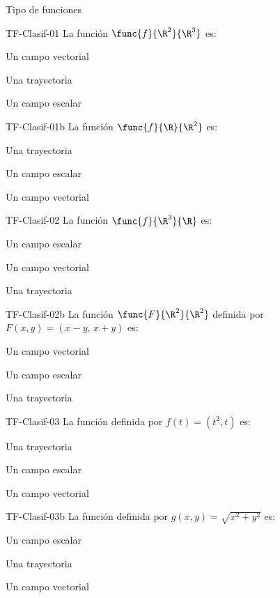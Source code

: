 \documentclass[a4,11pt]{aleph-notas}
\begin{document}
\begin{quiz}{Tipo de funciones}

\begin{multi}[]%
    {TF-Clasif-01}
    La función $\func{f}{\R^2}{\R^3}$ es:
    \item* Un campo vectorial
    \item Una trayectoria
    \item Un campo escalar
\end{multi}

\begin{multi}[]%
    {TF-Clasif-01b}
    La función $\func{f}{\R}{\R^2}$ es:
    \item* Una trayectoria
    \item Un campo escalar
    \item Un campo vectorial
\end{multi}

\begin{multi}[]%
    {TF-Clasif-02}
    La función $\func{f}{\R^3}{\R}$ es:
    \item* Un campo escalar
    \item Un campo vectorial
    \item Una trayectoria
\end{multi}

\begin{multi}[]%
    {TF-Clasif-02b}
    La función $\func{F}{\R^2}{\R^2}$ definida por $F(x,y)=(x-y,\, x+y)$ es:
    \item* Un campo vectorial
    \item Un campo escalar
    \item Una trayectoria
\end{multi}

\begin{multi}[]%
    {TF-Clasif-03}
    La función definida por $f(t)=(t^2, t)$ es:
    \item* Una trayectoria
    \item Un campo escalar
    \item Un campo vectorial
\end{multi}

\begin{multi}[]%
    {TF-Clasif-03b}
    La función definida por $g(x,y)=\sqrt{x^2+y^2}$ es:
    \item* Un campo escalar
    \item Una trayectoria
    \item Un campo vectorial
\end{multi}


\end{quiz}
\end{document}
